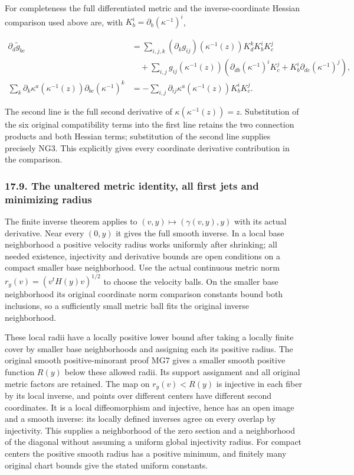 \documentclass[
  11pt,
]{article}
\begin{document}
For completeness the full differentiated metric and the
inverse-coordinate Hessian comparison used above are, with
\(K^i_b=\partial_b(\kappa^{-1})^i\),

\[
 \begin{aligned}
 \partial_d\widetilde g_{bc}
 &=\sum_{i,j,k}(\partial_kg_{ij})(\kappa^{-1}(z))
                           K^k_dK^i_bK^j_c\\
 &\quad+\sum_{i,j}g_{ij}(\kappa^{-1}(z))
       \left(\partial_{db}(\kappa^{-1})^iK^j_c
                        +K^i_b\partial_{dc}(\kappa^{-1})^j\right),\\
 \sum_k\partial_k\kappa^a(\kappa^{-1}(z))
                           \partial_{bc}(\kappa^{-1})^k
 &=-\sum_{i,j}\partial_{ij}\kappa^a(\kappa^{-1}(z))
                                             K^i_bK^j_c .
 \end{aligned}
 \tag{NG3a}
\]

The second line is the full second derivative of
\(\kappa(\kappa^{-1}(z))=z\). Substitution of the six original
compatibility terms into the first line retains the two connection
products and both Hessian terms; substitution of the second line
supplies precisely NG3. This explicitly gives every coordinate
derivative contribution in the comparison.

\subsubsection{17.9. The unaltered metric identity, all first jets and
minimizing
radius}\label{the-unaltered-metric-identity-all-first-jets-and-minimizing-radius}

The finite inverse theorem applies to \((v,y)\mapsto(\gamma(v,y),y)\)
with its actual derivative. Near every \((0,y)\) it gives the full
smooth inverse. In a local base neighborhood a positive velocity radius
works uniformly after shrinking; all needed existence, injectivity and
derivative bounds are open conditions on a compact smaller base
neighborhood. Use the actual continuous metric norm
\(r_y(v)=(v^tH(y)v)^{1/2}\) to choose the velocity balls. On the smaller
base neighborhood its original coordinate norm comparison constants
bound both inclusions, so a sufficiently small metric ball fits the
original inverse neighborhood.

These local radii have a locally positive lower bound after taking a
locally finite cover by smaller base neighborhoods and assigning each
its positive radius. The original smooth positive-minorant proof MG7
gives a smaller smooth positive function \(R(y)\) below these allowed
radii. Its support assignment and all original metric factors are
retained. The map on \(r_y(v)<R(y)\) is injective in each fiber by its
local inverse, and points over different centers have different second
coordinates. It is a local diffeomorphism and injective, hence has an
open image and a smooth inverse: its locally defined inverses agree on
every overlap by injectivity. This supplies a neighborhood of the zero
section and a neighborhood of the diagonal without assuming a uniform
global injectivity radius. For compact centers the positive smooth
radius has a positive minimum, and finitely many original chart bounds
give the stated uniform constants.
\end{document}
